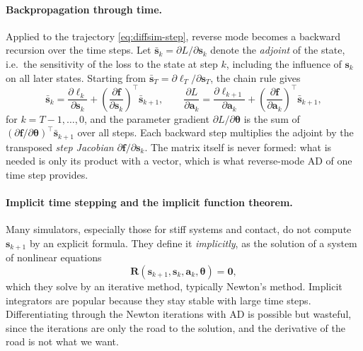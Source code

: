 \paragraph{Backpropagation through time.}
Applied to the trajectory \eqref{eq:diffsim-step}, reverse mode becomes a
backward recursion over the time steps. Let
$\bar{\mathbf{s}}_k = \partial L / \partial \mathbf{s}_k$ denote the
\emph{adjoint} of the state, i.e.\ the sensitivity of the loss to the state
at step $k$, including the influence of $\mathbf{s}_k$ on all later
states. Starting from $\bar{\mathbf{s}}_T = \partial \ell_T / \partial \mathbf{s}_T$,
the chain rule gives
\begin{equation}
  \bar{\mathbf{s}}_k
  = \frac{\partial \ell_k}{\partial \mathbf{s}_k}
  + \left(\frac{\partial \mathbf{f}}{\partial \mathbf{s}_k}\right)^{\!\top} \bar{\mathbf{s}}_{k+1},
  \qquad
  \frac{\partial L}{\partial \mathbf{a}_k}
  = \frac{\partial \ell_{k+1}}{\partial \mathbf{a}_k}
  + \left(\frac{\partial \mathbf{f}}{\partial \mathbf{a}_k}\right)^{\!\top} \bar{\mathbf{s}}_{k+1},
  \label{eq:diffsim-bptt}
\end{equation}
for $k = T-1, \dots, 0$, and the parameter gradient
$\partial L/\partial \boldsymbol{\theta}$ is the sum of
$(\partial \mathbf{f}/\partial \boldsymbol{\theta})^\top \bar{\mathbf{s}}_{k+1}$
over all steps. Each backward step multiplies the adjoint by the
transposed \emph{step Jacobian} $\partial \mathbf{f}/\partial \mathbf{s}_k$.
The matrix itself is never formed: what is needed is only its product with
a vector, which is what reverse-mode AD of one time step provides.

\paragraph{Implicit time stepping and the implicit function theorem.}
Many simulators, especially those for stiff systems and contact, do not
compute $\mathbf{s}_{k+1}$ by an explicit formula. They define it
\emph{implicitly}, as the solution of a system of nonlinear equations
\begin{equation}
  \mathbf{R}(\mathbf{s}_{k+1}, \mathbf{s}_k, \mathbf{a}_k, \boldsymbol{\theta}) = \mathbf{0},
  \label{eq:diffsim-residual}
\end{equation}
which they solve by an iterative method, typically Newton's method.
Implicit integrators are popular because they stay stable with large time
steps. Differentiating through the Newton iterations with AD is possible
but wasteful, since the iterations are only the road to the solution, and
the derivative of the road is not what we want.

